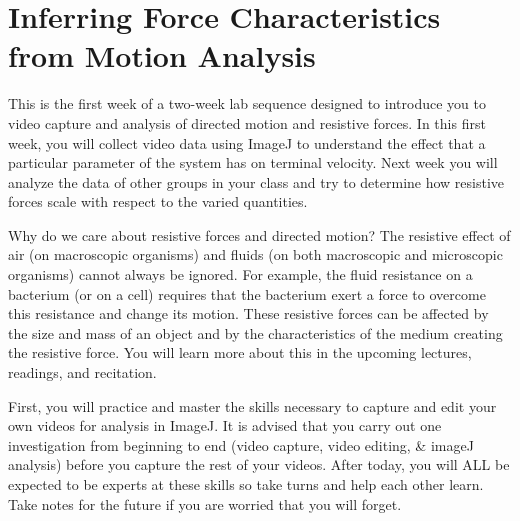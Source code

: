 \chapter{Inferring Force Characteristics from Motion Analysis}
\thispagestyle{fancy}
%
This is the first week of a two-week lab sequence designed to introduce you to video capture and analysis of directed motion and resistive forces.
In this first week, you will collect video data using ImageJ to understand the effect that a particular parameter of the system has on terminal velocity.
Next week you will analyze the data of other groups in your class and try to determine how resistive forces scale with respect to the varied quantities.
\par
Why do we care about resistive forces and directed motion?
The resistive effect of air (on macroscopic organisms) and fluids (on both macroscopic and microscopic organisms) cannot always be ignored.
For example, the fluid resistance on a bacterium (or on a cell) requires that the bacterium exert a force to overcome this resistance and change its motion.
These resistive forces can be affected by the size and mass of an object and by the characteristics of the medium creating the resistive force.
You will learn more about this in the upcoming lectures, readings, and recitation.
\par 
First, you will practice and master the skills necessary to capture and edit your own videos for analysis in ImageJ.
It is advised that you carry out one investigation from beginning to end (video capture, video editing, \& imageJ analysis) before you capture the rest of your videos.
After today, you will ALL be expected to be experts at these skills so take turns and help each other learn.
Take notes for the future if you are worried that you will forget.

